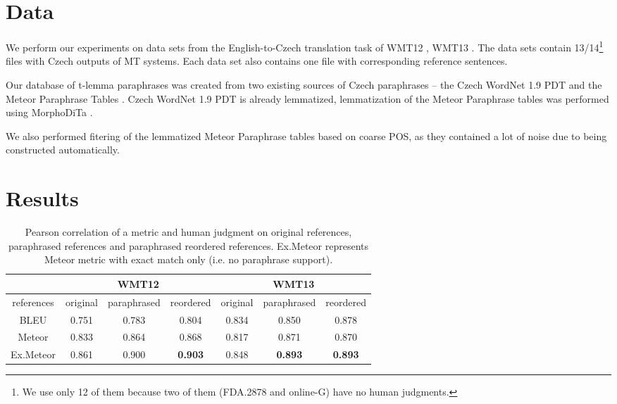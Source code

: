 
\section{Data}
We perform our experiments on data sets from the English-to-Czech 
translation  task of WMT12 \cite{wmt12}, WMT13 \cite{wmt13}. The data 
sets contain 13/14\footnote{We use only 12 of them because two of them (FDA.2878 
and online-G) have no human judgments.} files with Czech outputs of MT systems.
Each data set also contains one file with corresponding reference sentences.

Our database of t-lemma paraphrases was created from two existing sources of 
Czech paraphrases -- the Czech WordNet 1.9 PDT \cite{czech-wordnet} and the 
Meteor Paraphrase Tables \cite{meteor-tables}. Czech WordNet 1.9 PDT is already 
lemmatized, lemmatization of the Meteor Paraphrase tables was performed using 
MorphoDiTa \cite{morphodita}.

We also performed fitering of the lemmatized Meteor Paraphrase tables based on 
coarse POS, as they contained a lot of noise due to being constructed 
automatically.%

\section{Results}
\begin{table*}[tb]
\begin{center}


\begin{tabular}{|c|ccc|ccc|}
\hline
\multicolumn{1}{|l|}{} & \multicolumn{3}{c|}{\textbf{WMT12}}   & \multicolumn{3}{c|}{\textbf{WMT13}}  \\ 
\hline
references             & original & paraphrased & reordered & original & paraphrased & reordered \\ 
\hline
BLEU                   & 0.751    & 0.783       & 0.804     & 0.834    & 0.850       & 0.878       \\ 
Meteor                 & 0.833    & 0.864       & 0.868     & 0.817    & 0.871       & 0.870       \\ 
Ex.Meteor              & 0.861    & 0.900  & \textbf{0.903} & 0.848  & \textbf{0.893} & \textbf{0.893} \\ 
\hline
\end{tabular}
\caption{Pearson correlation of a metric and human judgment on original 
references, paraphrased references and paraphrased reordered references. 
Ex.Meteor represents Meteor metric with exact match only (i.e. no paraphrase
support).}
\label{results}
\end{center}
\end{table*}

